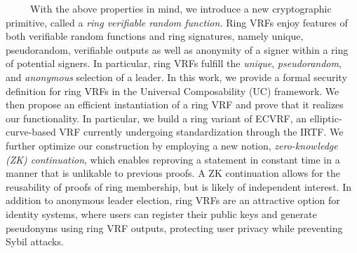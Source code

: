 ~~~~~With the above properties in mind, we introduce a new cryptographic primitive, called a 
\emph{ring verifiable random function.}
Ring VRFs enjoy features of both verifiable random functions and ring signatures, namely unique, pseudorandom, verifiable outputs as well as anonymity of a signer within a ring of potential signers.
In particular, ring VRFs fulfill the \emph{unique}, \emph{pseudorandom}, and \emph{anonymous} selection of a leader.
In this work, we provide a formal security definition for ring VRFs in the Universal Composability (UC) framework.
We then propose an efficient instantiation of a ring VRF and prove that it realizes our functionality.
In particular, we build a ring variant of ECVRF, an elliptic-curve-based VRF currently undergoing standardization through the IRTF.
We further optimize our construction by employing a new notion, \emph{zero-knowledge (ZK) continuation}, which enables reproving a statement in constant time in a manner that is unlikable to previous proofs.
A ZK continuation allows for the reusability of proofs of ring membership, but is likely of independent interest.
In addition to anonymous leader election, ring VRFs are an attractive option for identity systems, where users can register their public keys and generate pseudonyms using ring VRF outputs, protecting user privacy while preventing Sybil attacks.


